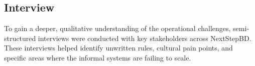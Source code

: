 \documentclass[12pt,a4paper]{report}
\begin{document}
\subsection{Interview}
To gain a deeper, qualitative understanding of the operational challenges, semi-structured interviews were conducted with key stakeholders across NextStepBD. These interviews helped identify unwritten rules, cultural pain points, and specific areas where the informal systems are failing to scale.

\newcommand{\interviewQ}[1]{\vspace{2pt}\noindent\textbf{Q: #1}\par}
\newcommand{\interviewA}[1]{\noindent\textit{A:}~#1\par\vspace{4pt}}
\end{document}
